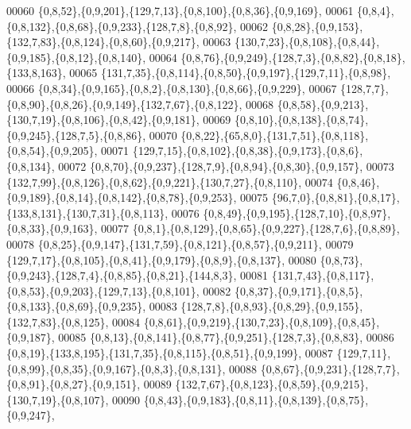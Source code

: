 \begin{DoxyCode}
00060         \{0,8,52\},\{0,9,201\},\{129,7,13\},\{0,8,100\},\{0,8,36\},\{0,9,169\},
00061         \{0,8,4\},\{0,8,132\},\{0,8,68\},\{0,9,233\},\{128,7,8\},\{0,8,92\},
00062         \{0,8,28\},\{0,9,153\},\{132,7,83\},\{0,8,124\},\{0,8,60\},\{0,9,217\},
00063         \{130,7,23\},\{0,8,108\},\{0,8,44\},\{0,9,185\},\{0,8,12\},\{0,8,140\},
00064         \{0,8,76\},\{0,9,249\},\{128,7,3\},\{0,8,82\},\{0,8,18\},\{133,8,163\},
00065         \{131,7,35\},\{0,8,114\},\{0,8,50\},\{0,9,197\},\{129,7,11\},\{0,8,98\},
00066         \{0,8,34\},\{0,9,165\},\{0,8,2\},\{0,8,130\},\{0,8,66\},\{0,9,229\},
00067         \{128,7,7\},\{0,8,90\},\{0,8,26\},\{0,9,149\},\{132,7,67\},\{0,8,122\},
00068         \{0,8,58\},\{0,9,213\},\{130,7,19\},\{0,8,106\},\{0,8,42\},\{0,9,181\},
00069         \{0,8,10\},\{0,8,138\},\{0,8,74\},\{0,9,245\},\{128,7,5\},\{0,8,86\},
00070         \{0,8,22\},\{65,8,0\},\{131,7,51\},\{0,8,118\},\{0,8,54\},\{0,9,205\},
00071         \{129,7,15\},\{0,8,102\},\{0,8,38\},\{0,9,173\},\{0,8,6\},\{0,8,134\},
00072         \{0,8,70\},\{0,9,237\},\{128,7,9\},\{0,8,94\},\{0,8,30\},\{0,9,157\},
00073         \{132,7,99\},\{0,8,126\},\{0,8,62\},\{0,9,221\},\{130,7,27\},\{0,8,110\},
00074         \{0,8,46\},\{0,9,189\},\{0,8,14\},\{0,8,142\},\{0,8,78\},\{0,9,253\},
00075         \{96,7,0\},\{0,8,81\},\{0,8,17\},\{133,8,131\},\{130,7,31\},\{0,8,113\},
00076         \{0,8,49\},\{0,9,195\},\{128,7,10\},\{0,8,97\},\{0,8,33\},\{0,9,163\},
00077         \{0,8,1\},\{0,8,129\},\{0,8,65\},\{0,9,227\},\{128,7,6\},\{0,8,89\},
00078         \{0,8,25\},\{0,9,147\},\{131,7,59\},\{0,8,121\},\{0,8,57\},\{0,9,211\},
00079         \{129,7,17\},\{0,8,105\},\{0,8,41\},\{0,9,179\},\{0,8,9\},\{0,8,137\},
00080         \{0,8,73\},\{0,9,243\},\{128,7,4\},\{0,8,85\},\{0,8,21\},\{144,8,3\},
00081         \{131,7,43\},\{0,8,117\},\{0,8,53\},\{0,9,203\},\{129,7,13\},\{0,8,101\},
00082         \{0,8,37\},\{0,9,171\},\{0,8,5\},\{0,8,133\},\{0,8,69\},\{0,9,235\},
00083         \{128,7,8\},\{0,8,93\},\{0,8,29\},\{0,9,155\},\{132,7,83\},\{0,8,125\},
00084         \{0,8,61\},\{0,9,219\},\{130,7,23\},\{0,8,109\},\{0,8,45\},\{0,9,187\},
00085         \{0,8,13\},\{0,8,141\},\{0,8,77\},\{0,9,251\},\{128,7,3\},\{0,8,83\},
00086         \{0,8,19\},\{133,8,195\},\{131,7,35\},\{0,8,115\},\{0,8,51\},\{0,9,199\},
00087         \{129,7,11\},\{0,8,99\},\{0,8,35\},\{0,9,167\},\{0,8,3\},\{0,8,131\},
00088         \{0,8,67\},\{0,9,231\},\{128,7,7\},\{0,8,91\},\{0,8,27\},\{0,9,151\},
00089         \{132,7,67\},\{0,8,123\},\{0,8,59\},\{0,9,215\},\{130,7,19\},\{0,8,107\},
00090         \{0,8,43\},\{0,9,183\},\{0,8,11\},\{0,8,139\},\{0,8,75\},\{0,9,247\},

\end{DoxyCode}
